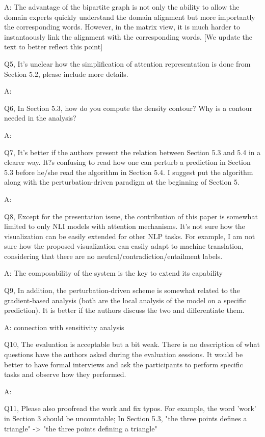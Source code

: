 A: The advantage of the bipartite graph is not only the ability to allow the domain experts quickly understand the domain alignment but more importantly the corresponding words. However, in the matrix view, it is much harder to instantaously link the alignment with the corresponding words. [We update the text to better reflect this point]

Q5, It's unclear how the simplification of attention representation is done from Section 5.2, please include more details.

A:

Q6, In Section 5.3, how do you compute the density contour? Why is a contour needed in the analysis?

A:

Q7, It's better if the authors present the relation between Section 5.3 and 5.4 in a clearer way. It?s confusing to read how one can perturb a prediction in Section 5.3 before he/she read the algorithm in Section 5.4. I suggest put the algorithm along with the perturbation-driven paradigm at the beginning of Section 5.

A:

Q8, Except for the presentation issue, the contribution of this paper is somewhat limited to only NLI models with attention mechanisms. It's not sure how the visualization can be easily extended for other NLP tasks. For example, I am not sure how the proposed visualization can easily adapt to machine translation, considering that there are no neutral/contradiction/entailment labels.

A: The composability of the system is the key to extend its capability

Q9, In addition, the perturbation-driven scheme is somewhat related to the gradient-based analysis (both are the local analysis of the model on a specific prediction). It is better if the authors discuss the two and differentiate them.

A: connection with sensitivity analysis

Q10, The evaluation is acceptable but a bit weak. There is no description of what questions have the authors asked during the evaluation sessions. It would be better to have formal interviews and ask the participants to perform specific tasks and observe how they performed.

A:

Q11, Please also proofread the work and fix typos. For example, the word 'work' in Section 3 should be uncountable; In Section 5.3, "the three points defines a triangle" -> "the three points defining a triangle"

